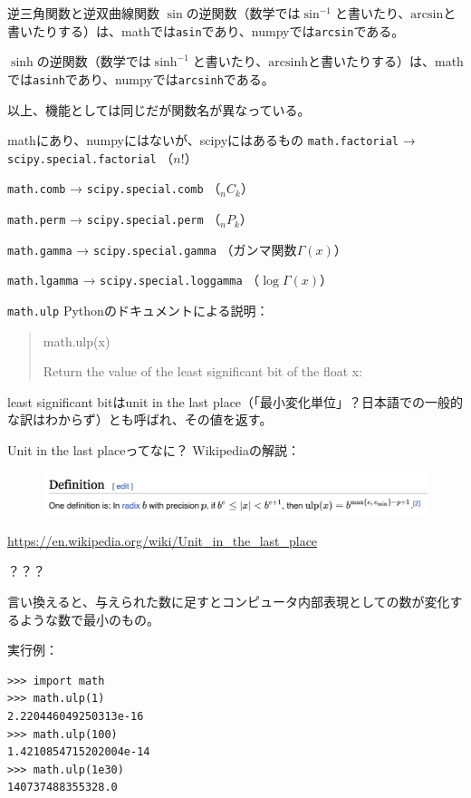 \documentclass[unicode,lualatex,aspectratio=169]{beamer}
\begin{document}
\begin{frame}[fragile]{逆三角関数と逆双曲線関数}
  $\sin$の逆関数（数学では$\sin^{-1}$と書いたり、$\mathrm{arcsin}$と書いたりする）は、mathでは\verb|asin|であり、numpyでは\verb|arcsin|である。

  
  $\sinh$の逆関数（数学では$\sinh^{-1}$と書いたり、$\mathrm{arcsinh}$と書いたりする）は、mathでは\verb|asinh|であり、numpyでは\verb|arcsinh|である。

  以上、機能としては同じだが関数名が異なっている。
\end{frame}
\begin{frame}[fragile]{mathにあり、numpyにはないが、scipyにはあるもの}
  \verb|math.factorial| → \verb|scipy.special.factorial| （$n!$）
  
  \verb|math.comb| → \verb|scipy.special.comb| （${}_n C_k$）
  
  \verb|math.perm| → \verb|scipy.special.perm| （${}_n P_k$）

  \verb|math.gamma| → \verb|scipy.special.gamma| （ガンマ関数$\Gamma(x)$）
  
  \verb|math.lgamma| → \verb|scipy.special.loggamma| （$\log \Gamma(x)$）
\end{frame}
\begin{frame}[fragile]{{\tt math.ulp}}
  Pythonのドキュメントによる説明：
  {\small
  \begin{quote}
    \noindent math.ulp(x)
    
    \hspace{3mm}Return the value of the least significant bit of the float x:
  \end{quote}
}

least significant bitはunit in the last place（「最小変化単位」？日本語での一般的な訳はわからず）とも呼ばれ、その値を返す。
\end{frame}
\begin{frame}[fragile]{Unit in the last placeってなに？}
Wikipediaの解説：
\begin{figure}[!ht]
\includegraphics[scale=.4]{img/wikipedia-ulp.png}
\end{figure}
{\tiny \url{https://en.wikipedia.org/wiki/Unit\_in\_the\_last\_place}}

？？？

言い換えると、与えられた数に足すとコンピュータ内部表現としての数が変化するような数で最小のもの。

実行例：
{\fontsize{6pt}{6pt}\selectfont    
\begin{verbatim}
>>> import math
>>> math.ulp(1)
2.220446049250313e-16
>>> math.ulp(100)
1.4210854715202004e-14
>>> math.ulp(1e30)
140737488355328.0
\end{verbatim}
}
\end{frame}
\end{document}
